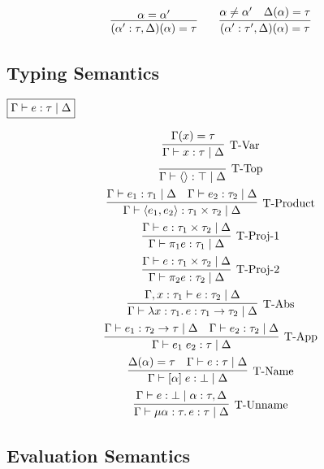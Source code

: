 \begin{gather*}
  \infer{(\alpha': \tau, \Delta)(\alpha) = \tau}{
    \alpha = \alpha'
  }
  \hspace{2em}
  \infer{(\alpha': \tau', \Delta)(\alpha) = \tau}{
    \alpha \neq \alpha'
    &
    \Delta(\alpha) = \tau
  }
\end{gather*}

\subsection{Typing Semantics}

$\fbox{$\Gamma \vdash e: \tau \mid \Delta$}$

\begin{gather*}
  \infer[\text{T-Var}]{\Gamma \vdash x: \tau \mid \Delta}{
    \Gamma(x) = \tau
  }
  \\
  \infer[\text{T-Top}]{\Gamma \vdash \langle\rangle: \top \mid \Delta}{}
  \\
  \infer[\text{T-Product}]{\Gamma \vdash \langle e_1, e_2\rangle: \tau_1 \times \tau_2 \mid \Delta}{
    \Gamma \vdash e_1: \tau_1 \mid \Delta
    &
    \Gamma \vdash e_2: \tau_2 \mid \Delta
  }
  \\
  \infer[\text{T-Proj-1}]{\Gamma \vdash \pi_1 e: \tau_1 \mid \Delta}{
    \Gamma \vdash e: \tau_1 \times \tau_2 \mid \Delta
  }
  \\
  \infer[\text{T-Proj-2}]{\Gamma \vdash \pi_2 e: \tau_2 \mid \Delta}{
    \Gamma \vdash e: \tau_1 \times \tau_2 \mid \Delta
  }
  \\
  \infer[\text{T-Abs}]{\Gamma \vdash \lambda x: \tau_1\ldotp e: \tau_1 \to \tau_2 \mid \Delta}{
    \Gamma, x: \tau_1 \vdash e: \tau_2 \mid \Delta
  }
  \\
  \infer[\text{T-App}]{\Gamma \vdash e_1\; e_2: \tau \mid \Delta}{
    \Gamma \vdash e_1: \tau_2 \to \tau \mid \Delta
    &
    \Gamma \vdash e_2: \tau_2 \mid \Delta
  }
  \\
  \infer[\text{T-Name}]{\Gamma \vdash [\alpha]\; e: \bot \mid \Delta}{
    \Delta(\alpha) = \tau
    &
    \Gamma \vdash e: \tau \mid \Delta
  }
  \\
  \infer[\text{T-Unname}]{\Gamma \vdash \mu \alpha: \tau\ldotp e: \tau \mid \Delta}{
    \Gamma \vdash e: \bot \mid \alpha: \tau, \Delta
  }
\end{gather*}

\subsection{Evaluation Semantics}

